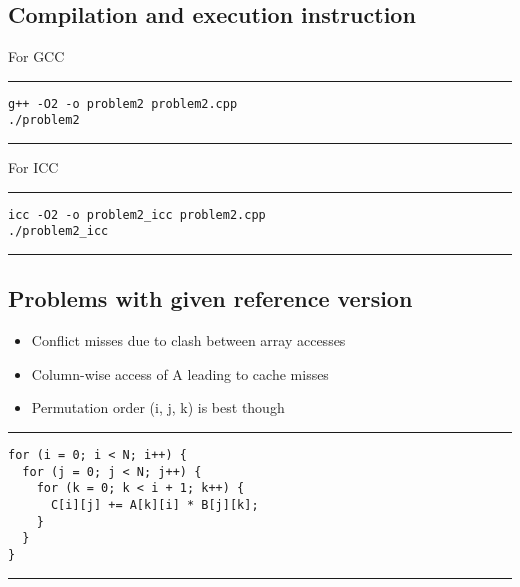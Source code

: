 \documentclass[a4paper]{article}
\begin{document}
\subsection{Compilation and execution instruction }
\vspace{0.3cm}
For GCC
\vspace{0.2cm}
\hrule
\begin{lstlisting}
g++ -O2 -o problem2 problem2.cpp
./problem2
\end{lstlisting}
\hrule 
\vspace{0.3cm}
For ICC
\vspace{0.2cm}
\hrule
\begin{lstlisting}
icc -O2 -o problem2_icc problem2.cpp
./problem2_icc
\end{lstlisting}
\hrule 
\vspace{0.5cm}


\subsection{Problems with given reference version}
\begin{minipage}{0.5\textwidth}
\begin{itemize}
\item Conflict misses due to clash between array accesses
\item Column-wise access of A leading to cache misses
\item Permutation order (i, j, k) is best though
\end{itemize}
\end{minipage}
\begin{minipage}{0.5\textwidth}
\hrule
\begin{lstlisting}
for (i = 0; i < N; i++) {
  for (j = 0; j < N; j++) {
    for (k = 0; k < i + 1; k++) {
      C[i][j] += A[k][i] * B[j][k];
    }
  }
}
\end{lstlisting}
\hrule 
\end{minipage}
\vspace{0.2cm}
\end{document}
